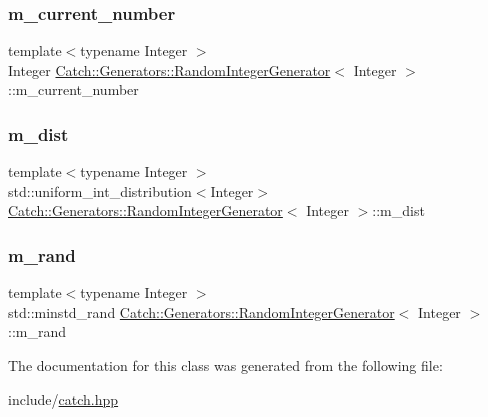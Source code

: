 \subsubsection{\texorpdfstring{m\_current\_number}{m\_current\_number}}
{\footnotesize\ttfamily template$<$typename Integer $>$ \\
Integer \mbox{\hyperlink{class_catch_1_1_generators_1_1_random_integer_generator}{Catch\+::\+Generators\+::\+Random\+Integer\+Generator}}$<$ Integer $>$\+::m\+\_\+current\+\_\+number\hspace{0.3cm}{\ttfamily [private]}}

\mbox{\label{class_catch_1_1_generators_1_1_random_integer_generator_a0f9a8e409e291c332ebba1667cdc90fe}} 
\subsubsection{\texorpdfstring{m\_dist}{m\_dist}}
{\footnotesize\ttfamily template$<$typename Integer $>$ \\
std\+::uniform\+\_\+int\+\_\+distribution$<$Integer$>$ \mbox{\hyperlink{class_catch_1_1_generators_1_1_random_integer_generator}{Catch\+::\+Generators\+::\+Random\+Integer\+Generator}}$<$ Integer $>$\+::m\+\_\+dist\hspace{0.3cm}{\ttfamily [private]}}

\mbox{\label{class_catch_1_1_generators_1_1_random_integer_generator_a8b64ca60f4711c9e29a68090ebdc1b94}} 
\subsubsection{\texorpdfstring{m\_rand}{m\_rand}}
{\footnotesize\ttfamily template$<$typename Integer $>$ \\
std\+::minstd\+\_\+rand \mbox{\hyperlink{class_catch_1_1_generators_1_1_random_integer_generator}{Catch\+::\+Generators\+::\+Random\+Integer\+Generator}}$<$ Integer $>$\+::m\+\_\+rand\hspace{0.3cm}{\ttfamily [private]}}



The documentation for this class was generated from the following file\+:\begin{DoxyCompactItemize}
\item 
include/\mbox{\hyperlink{catch_8hpp}{catch.\+hpp}}\end{DoxyCompactItemize}
